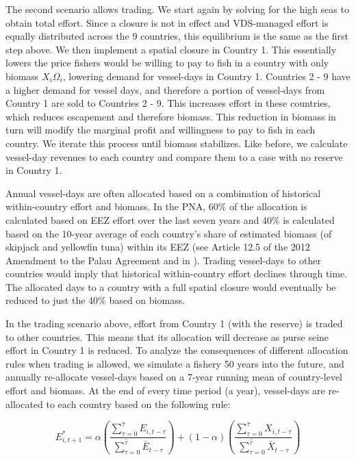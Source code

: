 \documentclass[12pt]{article}
\begin{document}
The second scenario allows trading. We start again by solving for the high seas to obtain total effort. Since a closure is not in effect and VDS-managed effort is equally distributed across the 9 countries, this equilibrium is the same as the first step above. We then implement a spatial closure in Country 1. This essentially lowers the price fishers would be willing to pay to fish in a country with only biomass $X_i\Omega_i$, lowering demand for vessel-days in Country 1. Countries 2 - 9 have a higher demand for vessel days, and therefore a portion of vessel-days from Country 1 are sold to Countries 2 - 9. This increases effort in these countries, which reduces escapement and therefore biomass. This reduction in biomass in turn will modify the marginal profit and willingness to pay to fish in each country. We iterate this process until biomass stabilizes. Like before, we calculate vessel-day revenues to each country and compare them to a case with no reserve in Country 1.

Annual vessel-days are often allocated based on a combination of historical within-country effort and biomass. In the PNA, 60\% of the allocation is calculated based on EEZ effort over the last seven years and 40\% is calculated based on the 10-year average of each country’s share of estimated biomass (of skipjack and yellowfin tuna) within its EEZ (see Article 12.5 of the 2012 Amendment to the Palau Agreement and in \cite{Hagrannsoknir2014}). Trading vessel-days to other countries would imply that historical within-country effort declines through time. The allocated days to a country with a full spatial closure would eventually be reduced to just the 40\% based on biomass.

In the trading scenario above, effort from Country 1 (with the reserve) is traded to other countries. This means that its allocation will decrease as purse seine effort in Country 1 is reduced. To analyze the consequences of different allocation rules when trading is allowed, we simulate a fishery 50 years into the future, and annually re-allocate vessel-days based on a 7-year running mean of country-level effort and biomass. At the end of every time period (a year), vessel-days are re-allocated to each country based on the following rule:

$$
E_{i,t+1}^* = \alpha
\left(\frac{\sum_{\tau = 0}^{\hat{\tau}}E_{i,t-\tau}}{\sum_{\tau = 0}^{\hat{\tau}}\bar{E}_{{t-\tau}}}
	\right)
	+
(1 - \alpha)
\left(\frac{\sum_{\tau = 0}^{\hat{\tau}}X_{i,t-\tau}}{\sum_{\tau = 0}^{\hat{\tau}}\bar{X}_{t-\tau}} \right)
$$
\end{document}
